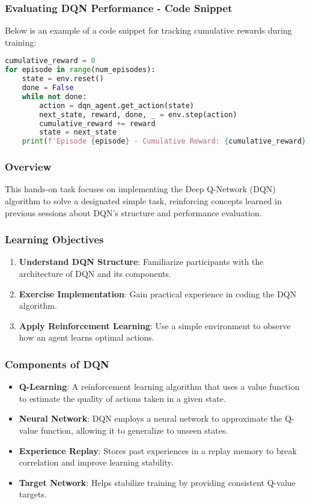 \documentclass{beamer}
\begin{document}
\begin{frame}[fragile]
    \frametitle{Evaluating DQN Performance - Code Snippet}
    Below is an example of a code snippet for tracking cumulative rewards during training:
    \begin{lstlisting}[language=Python]
cumulative_reward = 0
for episode in range(num_episodes):
    state = env.reset()
    done = False
    while not done:
        action = dqn_agent.get_action(state)
        next_state, reward, done, _ = env.step(action)
        cumulative_reward += reward
        state = next_state
    print(f'Episode {episode} - Cumulative Reward: {cumulative_reward}')
    \end{lstlisting}
\end{frame}

\begin{frame}
    \titlepage
\end{frame}

\begin{frame}
    \frametitle{Overview}
    This hands-on task focuses on implementing the Deep Q-Network (DQN) algorithm to solve a designated simple task, reinforcing concepts learned in previous sessions about DQN's structure and performance evaluation.
\end{frame}

\begin{frame}
    \frametitle{Learning Objectives}
    \begin{enumerate}
        \item \textbf{Understand DQN Structure}: Familiarize participants with the architecture of DQN and its components.
        \item \textbf{Exercise Implementation}: Gain practical experience in coding the DQN algorithm.
        \item \textbf{Apply Reinforcement Learning}: Use a simple environment to observe how an agent learns optimal actions.
    \end{enumerate}
\end{frame}

\begin{frame}
    \frametitle{Components of DQN}
    \begin{itemize}
        \item \textbf{Q-Learning}: A reinforcement learning algorithm that uses a value function to estimate the quality of actions taken in a given state.
        \item \textbf{Neural Network}: DQN employs a neural network to approximate the Q-value function, allowing it to generalize to unseen states.
        \item \textbf{Experience Replay}: Stores past experiences in a replay memory to break correlation and improve learning stability.
        \item \textbf{Target Network}: Helps stabilize training by providing consistent Q-value targets.
    \end{itemize}
\end{frame}
\end{document}

